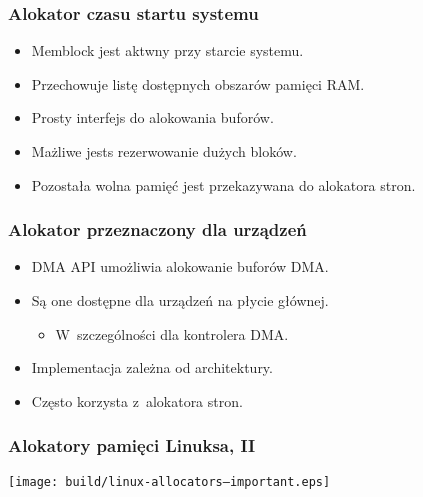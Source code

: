 \begin{frame}
  \frametitle{Alokator czasu startu systemu}

  \begin{itemize}
  \item Memblock jest aktwny przy starcie systemu.
  \item Przechowuje listę dostępnych obszarów pamięci RAM.
  \item Prosty interfejs do alokowania buforów.
  \item Mażliwe jests rezerwowanie dużych bloków.
  \item Pozostała wolna pamięć jest przekazywana do alokatora stron.
  \end{itemize}
\end{frame}

\begin{frame}
  \frametitle{Alokator przeznaczony dla urządzeń}

  \begin{itemize}
  \item DMA API umożliwia alokowanie buforów DMA.
  \item Są one dostępne dla urządzeń na płycie głównej.
    \begin{itemize}
    \item W~szczególności dla kontrolera DMA.
    \end{itemize}
  \item Implementacja zależna od architektury.
  \item Często korzysta z~alokatora stron.
  \end{itemize}
\end{frame}

\begin{frame}
  \frametitle{Alokatory pamięci Linuksa, II}

  \begin{center}
   \texttt{[image: build/linux-allocators--important.eps]}
  \end{center}
\end{frame}

